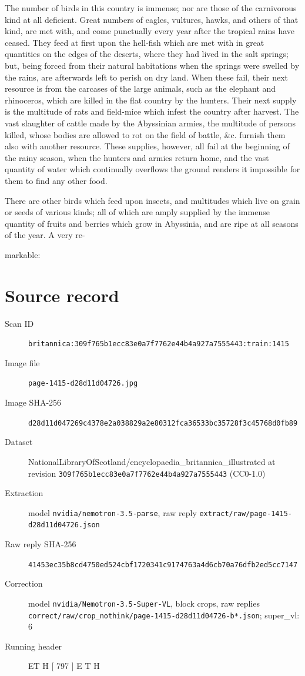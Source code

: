 \documentclass{article}
\begin{document}
The number of birds in this country is immense; nor are those of the carnivorous kind at all deficient. Great numbers of eagles, vultures, hawks, and others of that kind, are met with, and come punctually every year after the tropical rains have ceased. They feed at first upon the hell-fish which are met with in great quantities on the edges of the deserts, where they had lived in the salt springs; but, being forced from their natural habitations when the springs were swelled by the rains, are afterwards left to perish on dry land. When these fail, their next resource is from the carcases of the large animals, such as the elephant and rhinoceros, which are killed in the flat country by the hunters. Their next supply is the multitude of rats and field-mice which infest the country after harvest. The vast slaughter of cattle made by the Abyssinian armies, the multitude of persons killed, whose bodies are allowed to rot on the field of battle, \&c. furnish them also with another resource. These supplies, however, all fail at the beginning of the rainy season, when the hunters and armies return home, and the vast quantity of water which continually overflows the ground renders it impossible for them to find any other food.

There are other birds which feed upon insects, and multitudes which live on grain or seeds of various kinds; all of which are amply supplied by the immense quantity of fruits and berries which grow in Abyssinia, and are ripe at all seasons of the year. A very re-

markable:


\section*{Source record}
\begin{description}
\item[Scan ID] \texttt{britannica:309f765b1ecc83e0a7f7762e44b4a927a7555443:train:1415}
\item[Image file] \texttt{page-1415-d28d11d04726.jpg}
\item[Image SHA-256] \texttt{d28d11d047269c4378e2a038829a2e80312fca36533bc35728f3c45768d0fb89}
\item[Dataset] NationalLibraryOfScotland/encyclopaedia\_britannica\_illustrated at revision \texttt{309f765b1ecc83e0a7f7762e44b4a927a7555443} (CC0-1.0)
\item[Extraction] model \texttt{nvidia/nemotron-3.5-parse}, raw reply \texttt{extract/raw/page-1415-d28d11d04726.json}
\item[Raw reply SHA-256] \texttt{41453ec35b8cd4750ed524cbf1720341c9174763a4d6cb70a76dfb2ed5cc7147}
\item[Correction] model \texttt{nvidia/Nemotron-3.5-Super-VL}, block crops, raw replies \texttt{correct/raw/crop\_nothink/page-1415-d28d11d04726-b*.json}; super\_vl: 6
\item[Running header] ET H  [ 797 ] E T H
\end{description}
\end{document}
